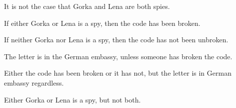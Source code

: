\problempart
\label{pr.spies}
\begin{earg}
\item It is not the case that Gorka and Lena are both spies.
\item[] 
\item If either Gorka or Lena is a spy, then the code has been broken.
\item[] 
\item If neither Gorka nor Lena is a spy, then the code has not been unbroken.
\item[] 
\item The letter is in the German embassy, unless someone has broken the code.
\item[] 
\item Either the code has been broken or it has not, but the letter is in German embassy regardless.
\item[] 
\item Either Gorka or Lena is a spy, but not both.
\item[] 
\end{earg}



